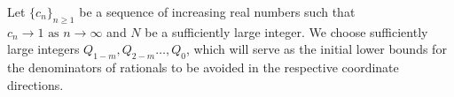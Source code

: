 \documentclass[11pt]{amsart}
\numberwithin{equation}{section}
\newcommand{\0}{\mathbf{0}}
\theoremstyle{remark}
\begin{document}
{%


Let $\{c_{n}\}_{n\ge 1}$ be a sequence of increasing real numbers such that $c_{n}\rightarrow 1\text{ as }n\rightarrow \infty$ and $N$ be a sufficiently large integer. We choose sufficiently large integers $Q_{1-m},Q_{2-m}\ldots,Q_{0}$, which will serve as the initial lower bounds for the denominators of rationals to be avoided in the respective coordinate directions.


}
\end{document}
